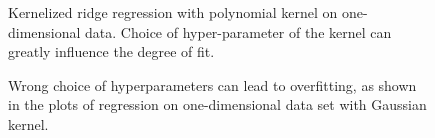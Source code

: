 \begin{refsection}
\begin{figure}
\caption{Kernelized ridge regression with polynomial kernel on one-dimensional data. Choice of hyper-parameter of the kernel can greatly influence the degree of fit.}
\label{fig:kernels-poly}
\end{figure}

\begin{figure}
\caption{Wrong choice of hyperparameters can lead to overfitting, as shown in the plots of regression on one-dimensional data set with Gaussian kernel.}
\label{fig:kernels-poly}
\end{figure}


\end{refsection}
